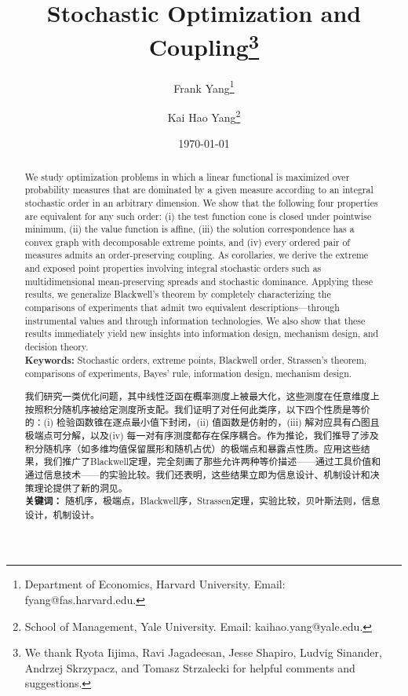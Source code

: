 \documentclass[12pt,letterpaper]{article}
\newenvironment{original}{\color{black}}{}
\newenvironment{translation}{\color{blue}}{}
\theoremstyle{plain}
\theoremstyle{definition}
\theoremstyle{remark}
\theoremstyle{definition}
\begin{document}
\title{\textbf{Stochastic Optimization and Coupling}\thanks{We thank Ryota Iijima, Ravi Jagadeesan, Jesse Shapiro, Ludvig Sinander, Andrzej Skrzypacz, and Tomasz Strzalecki for helpful comments and suggestions.}
}
\author{Frank Yang\thanks{Department of Economics, Harvard University. Email: fyang@fas.harvard.edu.} \and Kai Hao Yang\thanks{School of Management, Yale University. Email: kaihao.yang@yale.edu.}}
\date{\today
}
\maketitle

\begin{original}
\begin{abstract}
We study optimization problems in which a linear functional is maximized over probability measures that are dominated by a given measure according to an integral stochastic order in an arbitrary dimension. We show that the following four properties are equivalent for any such order: (i) the test function cone is closed under pointwise minimum, (ii) the value function is affine, (iii) the solution correspondence has a convex graph with decomposable extreme points, and (iv) every ordered pair of measures admits an order-preserving coupling. As corollaries, we derive the extreme and exposed point properties involving integral stochastic orders such as multidimensional mean-preserving spreads and stochastic dominance. Applying these results, we generalize Blackwell's theorem by completely characterizing the comparisons of experiments that admit two equivalent descriptions---through instrumental values and through information technologies. We also show that these results immediately yield new insights into information design, mechanism design, and decision theory.
\\


\noindent\textbf{Keywords:} Stochastic orders, extreme points, Blackwell order, Strassen's theorem, comparisons of experiments, Bayes' rule, information design, mechanism design.


\end{abstract}
\end{original}
\begin{translation}
\begin{abstract}
我们研究一类优化问题，其中线性泛函在概率测度上被最大化，这些测度在任意维度上按照积分随机序被给定测度所支配。我们证明了对任何此类序，以下四个性质是等价的：(i) 检验函数锥在逐点最小值下封闭，(ii) 值函数是仿射的，(iii) 解对应具有凸图且极端点可分解，以及(iv) 每一对有序测度都存在保序耦合。作为推论，我们推导了涉及积分随机序（如多维均值保留展形和随机占优）的极端点和暴露点性质。应用这些结果，我们推广了Blackwell定理，完全刻画了那些允许两种等价描述——通过工具价值和通过信息技术——的实验比较。我们还表明，这些结果立即为信息设计、机制设计和决策理论提供了新的洞见。
\\


\noindent\textbf{关键词：} 随机序，极端点，Blackwell序，Strassen定理，实验比较，贝叶斯法则，信息设计，机制设计。

\end{abstract}
\end{translation}
\end{document}
